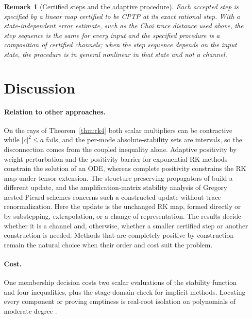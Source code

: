 \documentclass[pdflatex,sn-mathphys-num]{sn-jnl}
\theoremstyle{thmstyleone}
\theoremstyle{thmstylethree}
\theoremstyle{thmstyletwo}
\newtheorem{remark}{Remark}
\begin{document}
\begin{remark}[Certified steps and the adaptive procedure]\label{rem:scope}
Each accepted step is specified by a linear map certified to be CPTP at its exact rational step. With a state-independent error estimate, such as the Choi trace distance used above, the step sequence is the same for every input and the specified procedure is a composition of certified channels; when the step sequence depends on the input state, the procedure is in general nonlinear in that state and not a channel.
\end{remark}
\section{Discussion}\label{sec:discussion}

\paragraph{Relation to other approaches.} On the rays of Theorem~\ref{thm:rk4} both scalar multipliers can be contractive while $|c|^2\le a$ fails, and the per-mode absolute-stability sets are intervals, so the disconnection comes from the coupled inequality alone. Adaptive positivity by weight perturbation \cite{NussleinRanochaKetcheson2021} and the positivity barrier for exponential RK methods \cite{OstermannVanDaele2007} constrain the solution of an ODE, whereas complete positivity constrains the RK map under tensor extension. The structure-preserving propagators of \cite{RieschPiklJirauschek2020,CaoLu2025,AppeloCheng2025,HuAppeloCheng2025NPI,HuAppeloCheng2026Gregory,DelMastroAppeloCheng2026TT,RobinRouchonSellem2025,ChenEtAl2026} build a different update, and the amplification-matrix stability analysis of Gregory nested-Picard schemes \cite{HuAppeloCheng2026Gregory} concerns such a constructed update without trace renormalization. Here the update is the unchanged RK map, formed directly or by substepping, extrapolation, or a change of representation. The results decide whether it is a channel and, otherwise, whether a smaller certified step or another construction is needed. Methods that are completely positive by construction remain the natural choice when their order and cost suit the problem.

\paragraph{Cost.} One membership decision costs two scalar evaluations of the stability function and four inequalities, plus the stage-domain check for implicit methods. Locating every component or proving emptiness is real-root isolation on polynomials of moderate degree \cite{BasuPollackRoy2006}.
\end{document}
